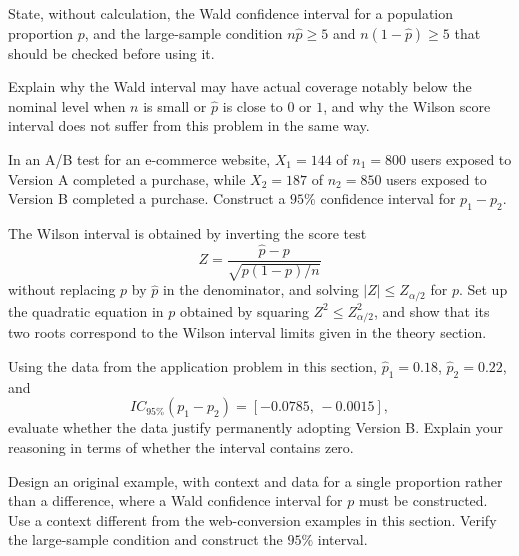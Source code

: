 \begin{problema}\label{prob:d02cdce}
State, without calculation, the Wald confidence interval for a population proportion $p$, and the large-sample condition $n\hat p\ge5$ and $n(1-\hat p)\ge5$ that should be checked before using it.
\end{problema}

\begin{problema}\label{prob:8394415}
Explain why the Wald interval may have actual coverage notably below the nominal level when $n$ is small or $\hat p$ is close to $0$ or $1$, and why the Wilson score interval does not suffer from this problem in the same way.
\end{problema}

\begin{problema}\label{prob:f92b151}
In an A/B test for an e-commerce website, $X_1=144$ of $n_1=800$ users exposed to Version A completed a purchase, while $X_2=187$ of $n_2=850$ users exposed to Version B completed a purchase. Construct a $95\%$ confidence interval for $p_1-p_2$.
\end{problema}

\begin{problema}\label{prob:2bf037d}
The Wilson interval is obtained by inverting the score test
\[
	Z=\frac{\hat p-p}{\sqrt{p(1-p)/n}}
\]
without replacing $p$ by $\hat p$ in the denominator, and solving $|Z|\le Z_{\alpha/2}$ for $p$. Set up the quadratic equation in $p$ obtained by squaring $Z^2\le Z_{\alpha/2}^2$, and show that its two roots correspond to the Wilson interval limits given in the theory section.
\end{problema}

\begin{problema}\label{prob:816285e}
Using the data from the application problem in this section, $\hat p_1=0.18$, $\hat p_2=0.22$, and
\[
	IC_{95\%}(p_1-p_2)=[-0.0785,\,-0.0015],
\]
evaluate whether the data justify permanently adopting Version B. Explain your reasoning in terms of whether the interval contains zero.
\end{problema}

\begin{problema}\label{prob:e10df82}
Design an original example, with context and data for a single proportion rather than a difference, where a Wald confidence interval for $p$ must be constructed. Use a context different from the web-conversion examples in this section. Verify the large-sample condition and construct the $95\%$ interval.
\end{problema}

